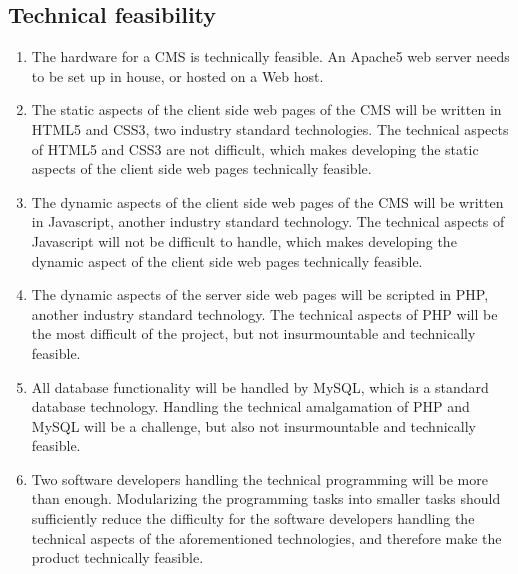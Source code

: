 \documentclass[11pt]{article}
\begin{document}
\subsection{Technical feasibility}

\begin{enumerate}
  \item The hardware for a CMS is technically feasible. An Apache5 web server needs to be set up in house, or hosted on a Web host.
  \item The static aspects of the client side web pages of the CMS will be written in HTML5 and CSS3, two industry standard technologies. The technical aspects of HTML5 and CSS3 are not difficult, which makes developing the static aspects of the client side web pages technically feasible.
  \item The dynamic aspects of the client side web pages of the CMS will be written in Javascript, another industry standard technology. The technical aspects of Javascript will not be difficult to handle, which makes developing the dynamic aspect of the client side web pages technically feasible.
  \item The dynamic aspects of the server side web pages will be scripted in PHP, another industry standard technology. The technical aspects of PHP will be the most difficult of the project, but not insurmountable and technically feasible.
  \item All database functionality will be handled by MySQL, which is a standard database technology. Handling the technical amalgamation of PHP and MySQL will be a challenge, but also not insurmountable and technically feasible.
  \item Two software developers handling the technical programming will be more than enough. Modularizing the programming tasks into smaller tasks should sufficiently reduce the difficulty for the software developers handling the technical aspects of the aforementioned technologies, and therefore make the product technically feasible.
\end{enumerate}
\end{document}
